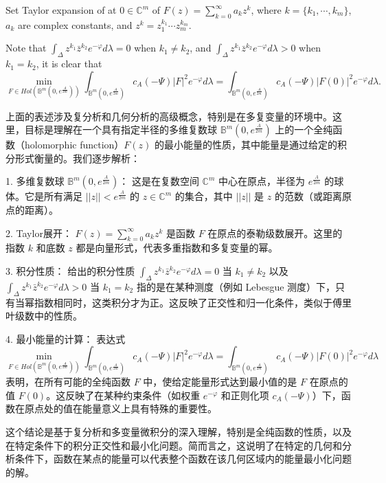 Set Taylor expansion of at $0\in\mathbb{C}^{m}$ of
$F(z)=\sum_{k=0}^{\infty}a_{k}z^{k}$, where
$k=\{k_{1},\cdots,k_{m}\}$, $a_{k}$ are complex constants, and
$z^{k}=z_{1}^{k_{1}}\cdots z_{m}^{k_{m}}$.

Note that
$\int_{\Delta}z^{k_{1}}\bar{z}^{k_{2}}e^{-\varphi}d\lambda=0$ when
$k_{1}\neq k_{2}$, and
$\int_{\Delta}z^{k_{1}}\bar{z}^{k_{2}}e^{-\varphi}d\lambda>0$ when
$k_{1}= k_{2}$, it is clear that
$$\min_{F\in Hol(\mathbb{B}^{m}(0,{e^{\frac{A}{2m}}}))}\int_{\mathbb{B}^{m}
(0,{e^{\frac{A}{2m}}})}c_{A}(-\Psi)|F|^{2}e^{-\varphi}d\lambda
=\int_{\mathbb{B}^{m}(0,{e^{\frac{A}{2m}}})}c_{A}(-\Psi)|F(0)|^{2}e^{-\varphi}d\lambda.$$
\begin{remark}
  上面的表述涉及复分析和几何分析的高级概念，特别是在多复变量的环境中。这里，目标是理解在一个具有指定半径的多维复数球 $\mathbb{B}^{m}(0, e^{\frac{A}{2m}})$ 上的一个全纯函数（holomorphic function）$F(z)$ 的最小能量的性质，其中能量是通过给定的积分形式衡量的。我们逐步解析：

1. 多维复数球 $\mathbb{B}^{m}(0, e^{\frac{A}{2m}})$： 这是在复数空间 $\mathbb{C}^m$ 中心在原点，半径为 $e^{\frac{A}{2m}}$ 的球体。它是所有满足 $||z|| < e^{\frac{A}{2m}}$ 的 $z \in \mathbb{C}^m$ 的集合，其中 $||z||$ 是 $z$ 的范数（或距离原点的距离）。

2. Taylor展开： $F(z) = \sum_{k=0}^{\infty}a_k z^k$ 是函数 $F$ 在原点的泰勒级数展开。这里的指数 $k$ 和底数 $z$ 都是向量形式，代表多重指数和多复变量的幂。

3. 积分性质： 给出的积分性质 $\int_{\Delta}z^{k_{1}}\bar{z}^{k_{2}}e^{-\varphi}d\lambda=0$ 当 $k_{1} \neq k_{2}$ 以及 $\int_{\Delta}z^{k_{1}}\bar{z}^{k_{2}}e^{-\varphi}d\lambda>0$ 当 $k_{1}=k_{2}$ 指的是在某种测度（例如 Lebesgue 测度）下，只有当幂指数相同时，这类积分才为正。这反映了正交性和归一化条件，类似于傅里叶级数中的性质。

4. 最小能量的计算： 表达式 $$\min_{F\in Hol(\mathbb{B}^{m}(0, e^{\frac{A}{2m}}))}\int_{\mathbb{B}^{m}(0, e^{\frac{A}{2m}})}c_{A}(-\Psi)|F|^2e^{-\varphi}d\lambda = \int_{\mathbb{B}^{m}(0, e^{\frac{A}{2m}})}c_{A}(-\Psi)|F(0)|^2e^{-\varphi}d\lambda$$ 表明，在所有可能的全纯函数 $F$ 中，使给定能量形式达到最小值的是 $F$ 在原点的值 $F(0)$。这反映了在某种约束条件（如权重 $e^{-\varphi}$ 和正则化项 $c_A(-\Psi)$）下，函数在原点处的值在能量意义上具有特殊的重要性。

这个结论是基于复分析和多变量微积分的深入理解，特别是全纯函数的性质，以及在特定条件下的积分正交性和最小化问题。简而言之，这说明了在特定的几何和分析条件下，函数在某点的能量可以代表整个函数在该几何区域内的能量最小化问题的解。


\end{remark}
